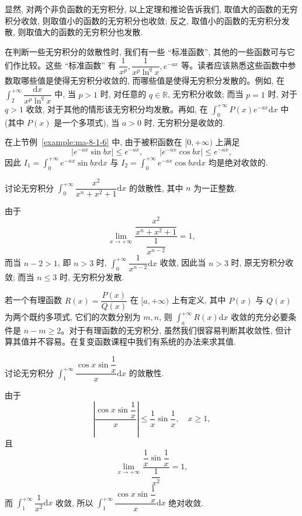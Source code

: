 显然, 对两个非负函数的无穷积分, 以上定理和推论告诉我们, 取值大的函数的无穷积分收敛, 则取值小的函数的无穷积分也收敛; 反之, 取值小的函数的无穷积分发散, 则取值大的函数的无穷积分也发散.

在判断一些无穷积分的敛散性时, 我们有一些 ``标准函数'', 其他的一些函数可与它们作比较。这些 ``标准函数'' 有 $\dfrac1{x^p},\dfrac1{x^p\ln^q x},e^{-ax}$ 等。读者应该熟悉这些函数中参数取哪些值是使得无穷积分收敛的, 而哪些值是使得无穷积分发散的。例如, 在 $\int_2^{+\infty}\dfrac{\mathrm dx}{x^p\ln^q x}$ 中, 当 $p>1$ 时, 对任意的 $q\in\mathbb R$, 无穷积分收敛; 而当 $p=1$ 时, 对于 $q>1$ 收敛, 对于其他的情形该无穷积分均发散。再如, 在 $\int_0^{+\infty}P(x)e^{-ax}\mathrm dx$ 中(其中 $P(x)$ 是一个多项式), 当 $a>0$ 时, 无穷积分是收敛的.

在上节例~\ref{example:ma-8-1-6} 中, 由于被积函数在 $[0,+\infty)$ 上满足
\[|e^{-ax}\sin bx|\leq e^{-ax},\qquad |e^{-ax}\cos bx|\leq e^{-ax},\]
 因此 $I_1=\int_0^{+\infty}e^{-ax}\sin bx\mathrm dx$ 与 $I_2=\int_0^{+\infty}e^{-ax}\cos bx\mathrm dx$ 均是绝对收敛的.

\begin{example}\label{example:ma-8-2-1}
讨论无穷积分 $\int_0^{+\infty}\dfrac{x^2}{x^n+x^2+1}\mathrm dx$ 的敛散性, 其中 $n$ 为一正整数.
\end{example}


\begin{solve}
由于
\[
  \lim_{x\to+\infty}
  \frac{\dfrac{x^2}{x^n+x^2+1}}{\dfrac1{x^{n-2}}}
  =
  1,
\]
而当 $n-2>1$, 即 $n>3$ 时, $\int_0^{+\infty}\dfrac1{x^{n-2}}\mathrm dx$ 收敛, 因此当 $n>3$ 时, 原无穷积分收敛; 而当 $n\leq3$ 时, 无穷积分发散.

若一个有理函数 $R(x)=\dfrac{P(x)}{Q(x)}$ 在 $[a,+\infty)$ 上有定义, 其中 $P(x)$ 与 $Q(x)$ 为两个既约多项式, 它们的次数分别为 $m,n$, 则 $\int_a^{+\infty}R(x)\mathrm dx$ 收敛的充分必要条件是 $n-m\geq2$。对于有理函数的无穷积分, 虽然我们很容易判断其收敛性, 但计算其值并不容易。在复变函数课程中我们有系统的办法来求其值.
\end{solve}


\begin{example}\label{example:ma-8-2-2}
讨论无穷积分 $\int_1^{+\infty}\dfrac{\cos x\sin\dfrac1x}{x}\mathrm dx$ 的敛散性.
\end{example}


\begin{solve}
由于
\[
  \left|\frac{\cos x\sin\dfrac1x}{x}\right|
  \leq
  \frac1x\sin\frac1x,\quad x\geq1,
\]
且
\[
  \lim_{x\to+\infty}
  \frac{\dfrac1x\sin\dfrac1x}{\dfrac1{x^2}}=1,
\]
而 $\int_1^{+\infty}\dfrac1{x^2}\mathrm dx$ 收敛, 所以 $\int_1^{+\infty}\dfrac{\cos x\sin\dfrac1x}{x}\mathrm dx$ 绝对收敛.
\end{solve}



